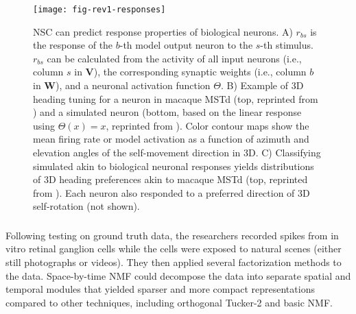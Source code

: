 \begin{figure}[h]
	\centering
	\texttt{[image: fig-rev1-responses]}
    \caption{\ac{NSC} can predict response properties of biological neurons.
    A) $r_{bs}$ is the response of the $b$-th model output neuron
       to the $s$-th stimulus. $r_{bs}$
       can be calculated from the activity of all
       input neurons (i.e., column $s$ in \textbf{V}), the
       corresponding synaptic weights (i.e., column $b$ in
       $\mathbf{W}$), and a neuronal activation function $\Theta$.
    B) Example of 3D heading tuning for a neuron in macaque
       \ac{MSTd} (top, reprinted from \cite{Takahashi2007}) and a
       simulated neuron (bottom,
       based on the linear response using $\Theta(x)=x$,
       reprinted from \cite{Beyeler2016}).
       Color contour maps show the mean firing rate or model
       activation as a function of azimuth and elevation angles
       of the self-movement direction in 3D.
    C) Classifying simulated akin to biological neuronal responses
       yields distributions of 3D heading preferences akin to 
       macaque \ac{MSTd} (top, reprinted from \cite{Beyeler2016}).
       Each neuron also responded to a preferred direction of 3D
       self-rotation (not shown).}
	\label{fig:NMF|neuronalresponse}
\end{figure}




\subsubsection*{}


Following testing on ground truth data, the researchers recorded spikes from in vitro retinal ganglion cells  while the cells were exposed to natural scenes (either still photographs or videos).
They then applied several factorization methods to the data. 
Space-by-time NMF could decompose the data into separate spatial and temporal modules that yielded sparser and more compact representations compared to other techniques, including orthogonal Tucker-2 and basic \ac{NMF}.



